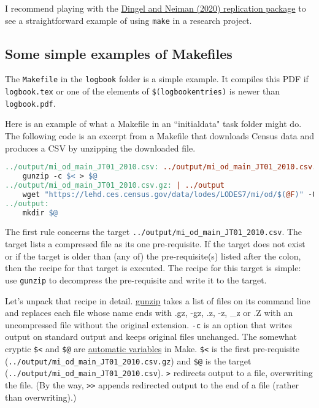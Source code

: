 I recommend playing with the
\href{https://github.com/jdingel/DingelNeiman-workathome}{Dingel and Neiman (2020) replication package}
to see a straightforward example of using \texttt{make} in a research project.

\subsection{Some simple examples of Makefiles}
\label{some_simple_examples_of_makefiles}

The \texttt{Makefile} in the \texttt{logbook} folder is a simple example.
It compiles this PDF if \texttt{logbook.tex} or one of the elements of \texttt{\$(logbookentries)} is newer than \texttt{logbook.pdf}.

Here is an example of what a Makefile in an ``initialdata" task folder might do.
The following code is an excerpt from a Makefile that downloads Census data and produces a CSV by unzipping the downloaded file.
\begin{lstlisting}[language=make]
../output/mi_od_main_JT01_2010.csv: ../output/mi_od_main_JT01_2010.csv.gz
	gunzip -c $< > $@
../output/mi_od_main_JT01_2010.csv.gz: | ../output
	wget "https://lehd.ces.census.gov/data/lodes/LODES7/mi/od/$(@F)" -O ../output/$(@F)
../output:
	mkdir $@
\end{lstlisting}
The first rule concerns the target \texttt{../output/mi\_od\_main\_JT01\_2010.csv}.
The target lists a compressed file as its one pre-requisite.
If the target does not exist or if the target is older than (any of) the pre-requisite(s) listed after the colon,
then the recipe for that target is executed.
The recipe for this target is simple: use \texttt{gunzip} to decompress the pre-requisite and write it to the target.

Let's unpack that recipe in detail.
\href{https://linux.die.net/man/1/gunzip}{gunzip} takes a list of files on its command line and replaces each file whose name ends with .gz, -gz, .z, -z, \_z or .Z with an uncompressed file without the original extension.
\texttt{-c} is an option that writes output on standard output and keeps original files unchanged.
The somewhat cryptic \texttt{\$<} and \texttt{\$@} are \href{https://www.gnu.org/software/make/manual/html_node/Automatic-Variables.html}{automatic variables} in Make.
\texttt{\$<} is the first pre-requisite (\texttt{../output/mi\_od\_main\_JT01\_2010.csv.gz})
and
\texttt{\$@} is the target (\texttt{../output/mi\_od\_main\_JT01\_2010.csv}).
\texttt{>} redirects output to a file, overwriting the file.
(By the way, \texttt{>>} appends redirected output to the end of a file (rather than overwriting).)

